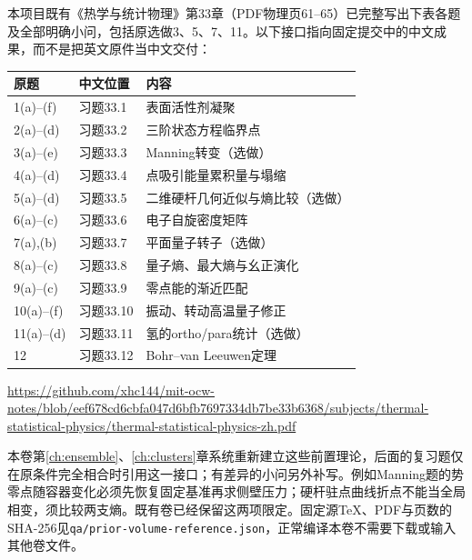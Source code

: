 本项目既有《热学与统计物理》第33章（PDF物理页61--65）已完整写出下表各题及全部明确小问，包括原选做3、5、7、11。以下接口指向固定提交中的中文成果，而不是把英文原件当中文交付：
\begin{center}\begin{tabular}{lll}\toprule 原题&中文位置&内容\\\midrule
1(a)--(f)&习题33.1&表面活性剂凝聚\\
2(a)--(d)&习题33.2&三阶状态方程临界点\\
3(a)--(e)&习题33.3&Manning转变（选做）\\
4(a)--(d)&习题33.4&点吸引能量累积量与塌缩\\
5(a)--(d)&习题33.5&二维硬杆几何近似与熵比较（选做）\\
6(a)--(c)&习题33.6&电子自旋密度矩阵\\
7(a),(b)&习题33.7&平面量子转子（选做）\\
8(a)--(c)&习题33.8&量子熵、最大熵与幺正演化\\
9(a)--(c)&习题33.9&零点能的渐近匹配\\
10(a)--(f)&习题33.10&振动、转动高温量子修正\\
11(a)--(d)&习题33.11&氢的ortho/para统计（选做）\\
12&习题33.12&Bohr--van Leeuwen定理\\\bottomrule\end{tabular}\end{center}
\url{https://github.com/xhc144/mit-ocw-notes/blob/eef678cd6cbfa047d6bfb7697334db7be33b6368/subjects/thermal-statistical-physics/thermal-statistical-physics-zh.pdf}

本卷第\ref{ch:ensemble}、\ref{ch:clusters}章系统重新建立这些前置理论，后面的复习题仅在原条件完全相合时引用这一接口；有差异的小问另外补写。例如Manning题的势零点随容器变化必须先恢复固定基准再求侧壁压力；硬杆驻点曲线折点不能当全局相变，须比较两支熵。既有卷已经保留这两项限定。固定源TeX、PDF与页数的SHA-256见\texttt{qa/prior-volume-reference.json}，正常编译本卷不需要下载或输入其他卷文件。

